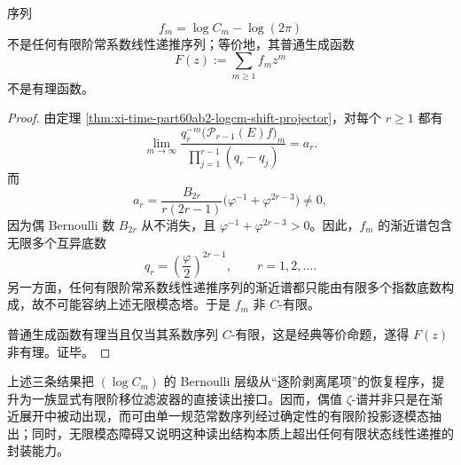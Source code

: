 \begin{theorem}\label{thm:xi-time-part60ab2-logcm-shift-infinite-modal}
序列
\[
f_m=\log C_m-\log(2\pi)
\]
不是任何有限阶常系数线性递推序列；等价地，其普通生成函数
\[
F(z):=\sum_{m\ge 1}f_m z^m
\]
不是有理函数。
\end{theorem}
\begin{proof}
由定理 \ref{thm:xi-time-part60ab2-logcm-shift-projector}，对每个 \(r\ge 1\) 都有
\[
\lim_{m\to\infty}
\frac{q_r^{-m}\bigl(\mathcal P_{r-1}(E)f\bigr)_m}
{\prod_{j=1}^{r-1}(q_r-q_j)}
=a_r.
\]
而
\[
a_r=
\frac{B_{2r}}{r(2r-1)}\bigl(\varphi^{-1}+\varphi^{2r-3}\bigr)\neq 0,
\]
因为偶 Bernoulli 数 \(B_{2r}\) 从不消失，且 \(\varphi^{-1}+\varphi^{2r-3}>0\)。因此，\(f_m\) 的渐近谱包含无限多个互异底数
\[
q_r=\left(\frac{\varphi}{2}\right)^{2r-1},
\qquad
r=1,2,\dots.
\]
另一方面，任何有限阶常系数线性递推序列的渐近谱都只能由有限多个指数底数构成，故不可能容纳上述无限模态塔。于是 \(f_m\) 非 \(C\)-有限。

普通生成函数有理当且仅当其系数序列 \(C\)-有限，这是经典等价命题，遂得 \(F(z)\) 非有理。证毕。
\end{proof}

\noindent
上述三条结果把 \((\log C_m)\) 的 Bernoulli 层级从“逐阶剥离尾项”的恢复程序，提升为一族显式有限阶移位滤波器的直接读出接口。因而，偶值 \(\zeta\)-谱并非只是在渐近展开中被动出现，而可由单一规范常数序列经过确定性的有限阶投影逐模态抽出；同时，无限模态障碍又说明这种读出结构本质上超出任何有限状态线性递推的封装能力。

\endinput
